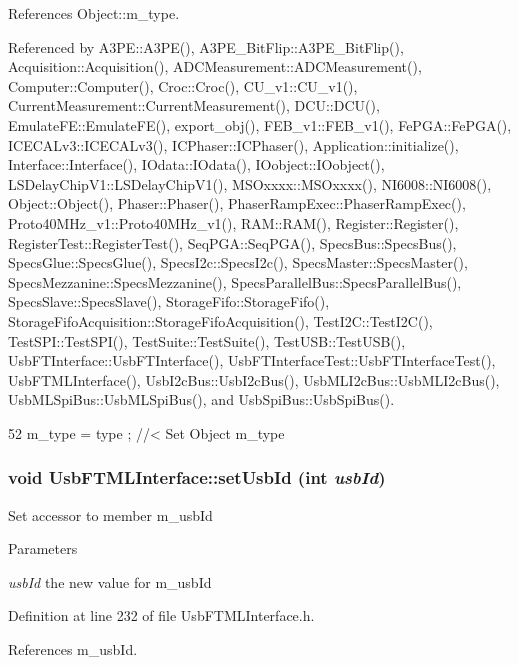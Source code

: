 References Object::m\_\-type.

Referenced by A3PE::A3PE(), A3PE\_\-BitFlip::A3PE\_\-BitFlip(), Acquisition::Acquisition(), ADCMeasurement::ADCMeasurement(), Computer::Computer(), Croc::Croc(), CU\_\-v1::CU\_\-v1(), CurrentMeasurement::CurrentMeasurement(), DCU::DCU(), EmulateFE::EmulateFE(), export\_\-obj(), FEB\_\-v1::FEB\_\-v1(), FePGA::FePGA(), ICECALv3::ICECALv3(), ICPhaser::ICPhaser(), Application::initialize(), Interface::Interface(), IOdata::IOdata(), IOobject::IOobject(), LSDelayChipV1::LSDelayChipV1(), MSOxxxx::MSOxxxx(), NI6008::NI6008(), Object::Object(), Phaser::Phaser(), PhaserRampExec::PhaserRampExec(), Proto40MHz\_\-v1::Proto40MHz\_\-v1(), RAM::RAM(), Register::Register(), RegisterTest::RegisterTest(), SeqPGA::SeqPGA(), SpecsBus::SpecsBus(), SpecsGlue::SpecsGlue(), SpecsI2c::SpecsI2c(), SpecsMaster::SpecsMaster(), SpecsMezzanine::SpecsMezzanine(), SpecsParallelBus::SpecsParallelBus(), SpecsSlave::SpecsSlave(), StorageFifo::StorageFifo(), StorageFifoAcquisition::StorageFifoAcquisition(), TestI2C::TestI2C(), TestSPI::TestSPI(), TestSuite::TestSuite(), TestUSB::TestUSB(), UsbFTInterface::UsbFTInterface(), UsbFTInterfaceTest::UsbFTInterfaceTest(), UsbFTMLInterface(), UsbI2cBus::UsbI2cBus(), UsbMLI2cBus::UsbMLI2cBus(), UsbMLSpiBus::UsbMLSpiBus(), and UsbSpiBus::UsbSpiBus().


\begin{DoxyCode}
52 { m_type  = type  ; } //< Set Object m_type
\end{DoxyCode}
\hypertarget{classUsbFTMLInterface_a00dc58835d65f98593e15287c1c8c6ab}{
\subsubsection[{setUsbId}]{\setlength{\rightskip}{0pt plus 5cm}void UsbFTMLInterface::setUsbId (int {\em usbId})}}
\label{classUsbFTMLInterface_a00dc58835d65f98593e15287c1c8c6ab}
Set accessor to member m\_\-usbId 
\begin{DoxyParams}{Parameters}
\item[{\em usbId}]the new value for m\_\-usbId \end{DoxyParams}


Definition at line 232 of file UsbFTMLInterface.h.

References m\_\-usbId.


